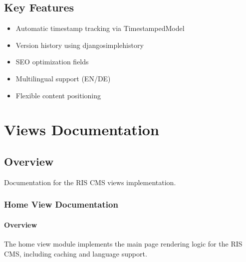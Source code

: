 \documentclass[letterpaper,10pt,english]{sphinxmanual}
\begin{document}
\subsection{Key Features}
\label{\detokenize{models/db_schema:key-features}}\begin{itemize}
\item {} 
\sphinxAtStartPar
Automatic timestamp tracking via TimestampedModel

\item {} 
\sphinxAtStartPar
Version history using django\sphinxhyphen{}simple\sphinxhyphen{}history

\item {} 
\sphinxAtStartPar
SEO optimization fields

\item {} 
\sphinxAtStartPar
Multilingual support (EN/DE)

\item {} 
\sphinxAtStartPar
Flexible content positioning

\end{itemize}

\sphinxstepscope


\section{Views Documentation}
\label{\detokenize{views/index:views-documentation}}\label{\detokenize{views/index::doc}}

\subsection{Overview}
\label{\detokenize{views/index:overview}}
\sphinxAtStartPar
Documentation for the RIS CMS views implementation.

\sphinxstepscope


\subsubsection{Home View Documentation}
\label{\detokenize{views/home:home-view-documentation}}\label{\detokenize{views/home::doc}}

\paragraph{Overview}
\label{\detokenize{views/home:overview}}
\sphinxAtStartPar
The home view module implements the main page rendering logic for the RIS CMS, including caching and language support.
\end{document}
